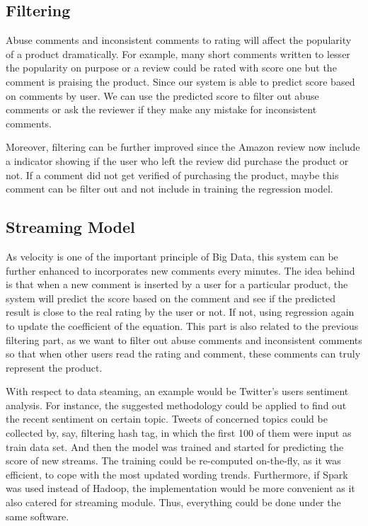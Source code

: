 \subsection{Filtering}
Abuse comments and inconsistent comments to rating will affect the popularity of a product dramatically. For example, many short comments written to lesser the popularity on purpose or a review could be rated with score one but the comment is praising the product. Since our system is able to predict score based on comments by user. We can use the predicted score to filter out abuse comments or ask the reviewer if they make any mistake for inconsistent comments. 

Moreover, filtering can be further improved since the Amazon review now include a indicator showing if the user who left the review did purchase the product or not. If a comment did not get verified of purchasing the product, maybe this comment can be filter out and not include in training the regression model.

\subsection{Streaming Model}
As velocity is one of the important principle of Big Data, this system can be further enhanced to incorporates new comments every minutes. The idea behind is that when a new comment is inserted by a user for a particular product, the system will predict the score based on the comment and see if the predicted result is close to the real rating by the user or not. If not, using regression again to update the coefficient of the equation. This part is also related to the previous filtering part, as we want to filter out abuse comments and inconsistent comments so that when other users read the rating and comment, these comments can truly represent the product.

With respect to data steaming, an example would be Twitter's users sentiment analysis. For instance, the suggested methodology could be applied to find out the recent sentiment on certain topic. Tweets of concerned topics could be collected by, say, filtering hash tag, in which the first 100 of them were input as train data set. And then the model was trained and started for predicting the score of new streams. The training could be re-computed on-the-fly, as it was efficient, to cope with the most updated wording trends. Furthermore, if Spark was used instead of Hadoop, the implementation would be more convenient as it also catered for streaming module. Thus, everything could be done under the same software.



